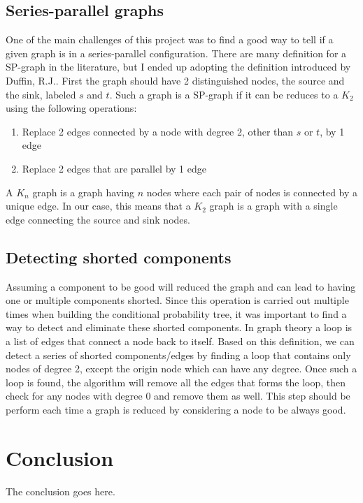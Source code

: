 \documentclass[conference]{IEEEtran}
\begin{document}
\subsection{Series-parallel graphs}
One of the main challenges of this project was to find a good way to tell if a
given graph is in a series-parallel configuration. There are many definition for
a SP-graph in the literature, but I ended up adopting the definition introduced
by Duffin, R.J.\cite{spg}. First the graph should have 2 distinguished nodes,
the source and the sink, labeled $s$ and $t$. Such a graph is a SP-graph if it can be
reduces to a $K_2$ using the following operations:
\begin{enumerate}
\item{Replace 2 edges connected by a node with degree 2, other than $s$ or $t$, by 1 edge}
\item{Replace 2 edges that are parallel by 1 edge}
\end{enumerate}
A $K_n$ graph is a graph having $n$ nodes where each pair of nodes is connected
by a unique edge. In our case, this means that a $K_2$ graph is a graph with a single edge
connecting the source and sink nodes.

\subsection{Detecting shorted components}
Assuming a component to be good will reduced the graph and can lead to having
one or multiple components shorted. Since this operation is carried out
multiple times when building the conditional probability tree, it was important
to find a way to detect and eliminate these shorted components. In graph theory
a loop is a list of edges that connect a node back to itself. Based on this
definition, we can detect a series of shorted components/edges by finding a loop
that contains only nodes of degree 2, except the origin node which can have any
degree. Once such a loop is found, the algorithm will remove all the edges that
forms the loop, then check for any nodes with degree 0 and remove them as well.
This step should be perform each time a graph is reduced by considering a node
to be always good.


\section{Conclusion}
The conclusion goes here.




\end{document}

